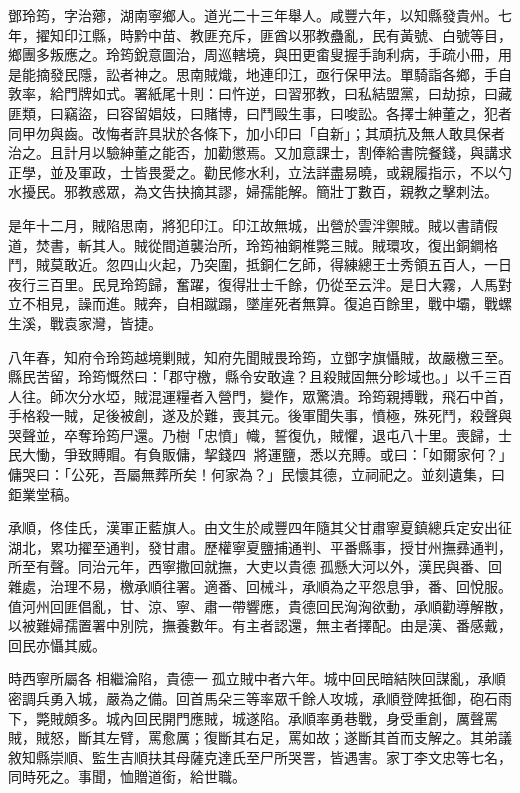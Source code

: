 \begin{pinyinscope}
鄧玲筠，字治薌，湖南寧鄉人。道光二十三年舉人。咸豐六年，以知縣發貴州。七年，擢知印江縣，時黔中苗、教匪充斥，匪酋以邪教蠱亂，民有黃號、白號等目，鄉團多叛應之。玲筠銳意圖治，周巡轄境，與田更畬叟握手詢利病，手疏小冊，用是能摘發民隱，訟者神之。思南賊熾，地連印江，亟行保甲法。單騎詣各鄉，手自敦率，給門牌如式。署紙尾十則：曰忤逆，曰習邪教，曰私結盟黨，曰劫掠，曰藏匪類，曰竊盜，曰容留娼妓，曰賭博，曰鬥毆生事，曰唆訟。各擇士紳董之，犯者同甲勿與齒。改悔者許具狀於各條下，加小印曰「自新」；其頑抗及無人敢具保者治之。且計月以驗紳董之能否，加勸懲焉。又加意課士，割俸給書院餐錢，與講求正學，並及軍政，士皆畏愛之。勸民修水利，立法詳盡易曉，或親履指示，不以勺水擾民。邪教惑眾，為文告抉摘其謬，婦孺能解。簡壯丁數百，親教之擊刺法。

是年十二月，賊陷思南，將犯印江。印江故無城，出營於雲泮禦賊。賊以書請假道，焚書，斬其人。賊從間道襲治所，玲筠袖銅椎斃三賊。賊環攻，復出銅鐧格鬥，賊莫敢近。忽四山火起，乃突圍，抵銅仁乞師，得練總王士秀領五百人，一日夜行三百里。民見玲筠歸，奮躍，復得壯士千餘，仍從至云泮。是日大霧，人馬對立不相見，譟而進。賊奔，自相蹴蹋，墜崖死者無算。復追百餘里，戰中壩，戰螺生溪，戰袁家灣，皆捷。

八年春，知府令玲筠越境剿賊，知府先聞賊畏玲筠，立鄧字旗懾賊，故嚴檄三至。縣民苦留，玲筠慨然曰：「郡守檄，縣令安敢違？且殺賊固無分畛域也。」以千三百人往。師次分水埡，賊混運糧者入營門，變作，眾驚潰。玲筠親搏戰，飛石中首，手格殺一賊，足後被創，遂及於難，喪其元。後軍聞失事，憤極，殊死鬥，殺聲與哭聲並，卒奪玲筠尸還。乃樹「忠憤」幟，誓復仇，賊懼，退屯八十里。喪歸，士民大慟，爭致賻賵。有負販傭，挈錢四，將運鹽，悉以充賻。或曰：「如爾家何？」傭哭曰：「公死，吾屬無葬所矣！何家為？」民懷其德，立祠祀之。並刻遺集，曰鉅業堂稿。

承順，佟佳氏，漢軍正藍旗人。由文生於咸豐四年隨其父甘肅寧夏鎮總兵定安出征湖北，累功擢至通判，發甘肅。歷權寧夏鹽捕通判、平番縣事，授甘州撫彞通判，所至有聲。同治元年，西寧撒回就撫，大吏以貴德孤懸大河以外，漢民與番、回雜處，治理不易，檄承順往署。適番、回械斗，承順為之平怨息爭，番、回悅服。值河州回匪倡亂，甘、涼、寧、肅一帶響應，貴德回民洶洶欲動，承順勸導解散，以被難婦孺置署中別院，撫養數年。有主者認還，無主者擇配。由是漢、番感戴，回民亦懾其威。

時西寧所屬各相繼淪陷，貴德一孤立賊中者六年。城中回民暗結陜回謀亂，承順密調兵勇入城，嚴為之備。回首馬朵三等率眾千餘人攻城，承順登陴抵御，砲石雨下，斃賊頗多。城內回民開門應賊，城遂陷。承順率勇巷戰，身受重創，厲聲罵賊，賊怒，斷其左臂，罵愈厲；復斷其右足，罵如故；遂斷其首而支解之。其弟議敘知縣崇順、監生吉順扶其母薩克達氏至尸所哭詈，皆遇害。家丁李文忠等七名，同時死之。事聞，恤贈道銜，給世職。


\end{pinyinscope}
